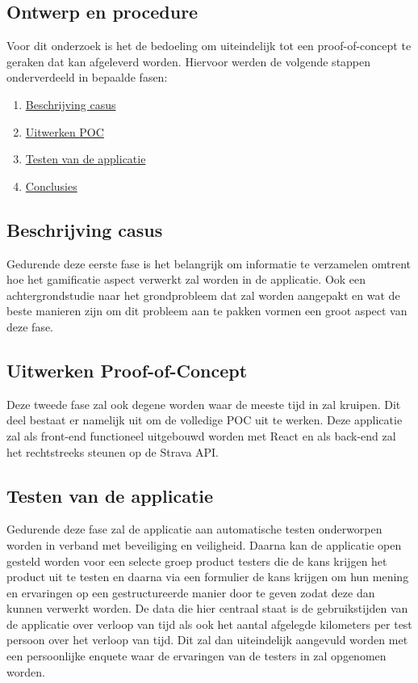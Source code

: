 \subsection{Ontwerp en procedure}

Voor dit onderzoek is het de bedoeling om uiteindelijk tot een proof-of-concept te geraken dat kan afgeleverd worden. Hiervoor werden de volgende stappen onderverdeeld in bepaalde fasen:

\begin{enumerate}
    \item \hyperref[subsub:beschrijving]{Beschrijving casus}
    \item \hyperref[subsub:uitwerking]{Uitwerken POC}
    \item \hyperref[subsub:testfase]{Testen van de applicatie}
    \item \hyperref[subsub:conclusies]{Conclusies}
\end{enumerate}

\subsection{Beschrijving casus}
\label{subsub:beschrijving}

Gedurende deze eerste fase is het belangrijk om informatie te verzamelen omtrent hoe het gamificatie aspect verwerkt zal worden in de applicatie. Ook een achtergrondstudie naar het grondprobleem dat zal worden aangepakt en wat de beste manieren zijn om dit probleem aan te pakken vormen een groot aspect van deze fase. \\

\subsection{Uitwerken Proof-of-Concept}
\label{subsub:uitwerking}

Deze tweede fase zal ook degene worden waar de meeste tijd in zal kruipen. Dit deel bestaat er namelijk uit om de volledige POC uit te werken. Deze applicatie zal als front-end functioneel uitgebouwd worden met React en als back-end zal het rechtstreeks steunen op de Strava API. 

\subsection{Testen van de applicatie}
\label{subsub:testfase}

Gedurende deze fase zal de applicatie aan automatische testen onderworpen worden in verband met beveiliging en veiligheid. Daarna kan de applicatie open gesteld worden voor een selecte groep product testers die de kans krijgen het product uit te testen en daarna via een formulier de kans krijgen om hun mening en ervaringen op een gestructureerde manier door te geven zodat deze dan kunnen verwerkt worden. De data die hier centraal staat is de gebruikstijden van de applicatie over verloop van tijd als ook het aantal afgelegde kilometers per test persoon over het verloop van tijd. Dit zal dan uiteindelijk aangevuld worden met een persoonlijke enquete waar de ervaringen van de testers in zal opgenomen worden. 

